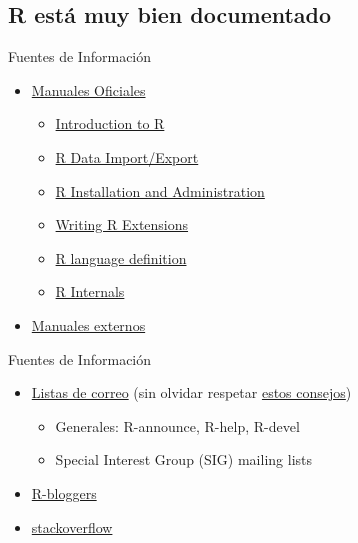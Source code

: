 \documentclass[xcolor={usenames,svgnames,dvipsnames}]{beamer}
\begin{document}
\subsection{R está muy bien documentado}
\label{sec-1-2}

\begin{frame}[label=sec-1-2-1]{Fuentes de Información}
\begin{itemize}
\item \href{http://cran.r-project.org/manuals.html}{Manuales Oficiales}

\begin{itemize}
\item \href{http://cran.r-project.org/doc/manuals/r-release/R-intro.html}{Introduction to R}

\item \href{http://cran.r-project.org/doc/manuals/r-release/R-data.html}{R Data Import/Export}

\item \href{http://cran.r-project.org/doc/manuals/r-release/R-admin.html}{R Installation and Administration}

\item \href{http://cran.r-project.org/doc/manuals/r-release/R-exts.html}{Writing R Extensions}

\item \href{http://cran.r-project.org/doc/manuals/r-release/R-lang.html}{R language definition}

\item \href{http://cran.r-project.org/doc/manuals/r-release/R-ints.html}{R Internals}
\end{itemize}

\item \href{http://cran.r-project.org/other-docs.html}{Manuales externos}
\end{itemize}
\end{frame}

\begin{frame}[label=sec-1-2-2]{Fuentes de Información}
\begin{itemize}
\item \href{http://www.r-project.org/mail.html}{Listas de correo} (sin olvidar respetar \href{http://www.r-project.org/posting-guide.html}{estos consejos})
\begin{itemize}
\item Generales: R-announce, R-help, R-devel
\item Special Interest Group (SIG) mailing lists
\end{itemize}
\item \href{http://www.r-bloggers.com}{R-bloggers}
\item \href{http://stackoverflow.com/questions/tagged/r}{stackoverflow}
\end{itemize}
\end{frame}
\end{document}
